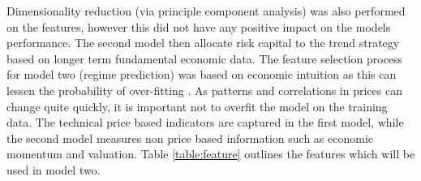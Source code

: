 \documentclass[11pt]{article}
\begin{document}
\begin{table}[h] 
\centering      %
\caption{Model One: Trend Capture} %
\label{table:feature} %
\end{table} 

Dimensionality reduction (via principle component analysis) was also performed on the features, however this did not have any positive impact on the models performance.
The second model then allocate risk capital to the trend strategy based on longer term fundamental economic data.
The feature selection process for model two (regime prediction) was based on economic intuition as this can lessen the probability of over-fitting \cite{Arnott2018}. \newline As patterns and correlations in prices can change quite quickly, it is important not to overfit the model on the training data.  The technical price based indicators are captured in the first model, while the second model measures non price based information such as economic momentum and valuation. 
Table \ref{table:feature} outlines the features which will be used in model two.
\begin{table}[h] 
\centering      %
\caption{Model Two: Trend Strength Estimation} %
\label{table:feature2} %
\end{table} 
\end{document}
